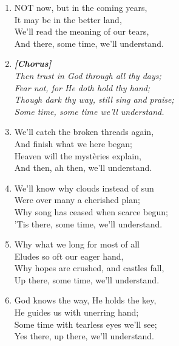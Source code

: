 \begin{enumerate}
    \item NOT now, but in the coming years, \\
        It may be in the better land, \\
        We'll read the meaning of our tears, \\
        And there, some time, we'll understand.

    \item[] \vspace{0.4em}
    \textbf{\textit{[Chorus]}} \\
    \textit{Then trust in God through all thy days;} \\
    \textit{Fear not, for He doth hold thy hand;} \\
    \textit{Though dark thy way, still sing and praise;} \\
    \textit{Some time, some time we'll understand.}
    \vspace{0.4em}

    \item We'll catch the broken threads again, \\
        And finish what we here began; \\
        Heaven will the myst\`eries explain, \\
        And then, ah then, we'll understand.

    \item We'll know why clouds instead of sun \\
        Were over many a cherished plan; \\
        Why song has ceased when scarce begun; \\
        'Tis there, some time, we'll understand.

    \item Why what we long for most of all \\
        Eludes so oft our eager hand, \\
        Why hopes are crushed, and castles fall, \\
        Up there, some time, we'll understand.

    \item God knows the way, He holds the key, \\
        He guides us with unerring hand; \\
        Some time with tearless eyes we'll see; \\
        Yes there, up there, we'll understand.

\end{enumerate}

